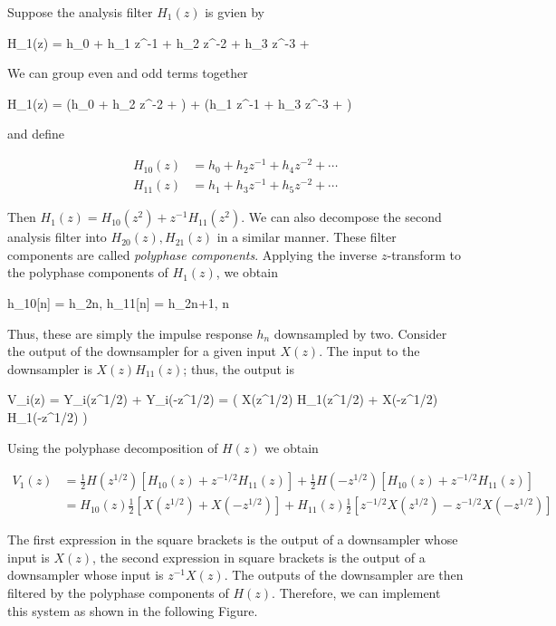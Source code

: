 Suppose the analysis filter $H_1(z)$ is gvien by

\bee
H_1(z) = h_0 + h_1 z^{-1} + h_2 z^{-2} + h_3 z^{-3} + \cdots
\eee

We can group even and odd terms together

\bee
H_1(z) = (h_0 + h_2 z^{-2} + \cdots) + (h_1 z^{-1} + h_3 z^{-3} + \cdots)
\eee

and define

\begin{align}
  H_{10}(z) &= h_0 + h_2 z^{-1} + h_4 z^{-2} + \cdots \\
  H_{11}(z) &= h_1 + h_3 z^{-1} + h_5 z^{-2} + \cdots
\end{align}

Then $H_1(z) = H_{10}(z^2) + z^{-1} H_{11}(z^2)$. We can also decompose the second analysis filter into $H_{20}(z), H_{21}(z)$ in a similar manner. These filter components are called \emph{polyphase components}. Applying the inverse $z$-transform to the polyphase components of $H_1(z)$, we obtain

\bee
h_{10}[n] = h_{2n}, h_{11}[n] = h_{2n+1}, \quad \forall n
\eee

Thus, these are simply the impulse response $h_n$ downsampled by two. Consider the output of the downsampler for a given input $X(z)$. The input to the downsampler is $X(z)H_11(z)$; thus, the output is

\bee
V_i(z) =  Y_i(z^{1/2}) +  Y_i(-z^{1/2}) =  \left( X(z^{1/2}) H_1(z^{1/2}) + X(-z^{1/2}) H_1(-z^{1/2}) \right)
\eee

Using the polyphase decomposition of $H(z)$ we obtain

\begin{align*}
  V_1(z) &= \frac{1}{2} H(z^{1/2}) \left[ H_{10}(z) + z^{-1/2} H_{11}(z) \right] + \frac{1}{2} H(-z^{1/2}) \left[ H_{10}(z) + z^{-1/2} H_{11}(z) \right] \\
  &= H_{10}(z) \frac{1}{2} \left[ X(z^{1/2}) + X(-z^{1/2}) \right] + H_{11}(z) \frac{1}{2} \left[ z^{-1/2} X(z^{1/2}) - z^{-1/2} X(-z^{1/2}) \right]
\end{align*}

The first expression in the square brackets is the output of a downsampler whose input is $X(z)$, the second expression in square brackets is the output of a downsampler whose input is $z^{-1}X(z)$. The outputs of the downsampler are then filtered by the polyphase components of $H(z)$. Therefore, we can implement this system as shown in the following Figure.

